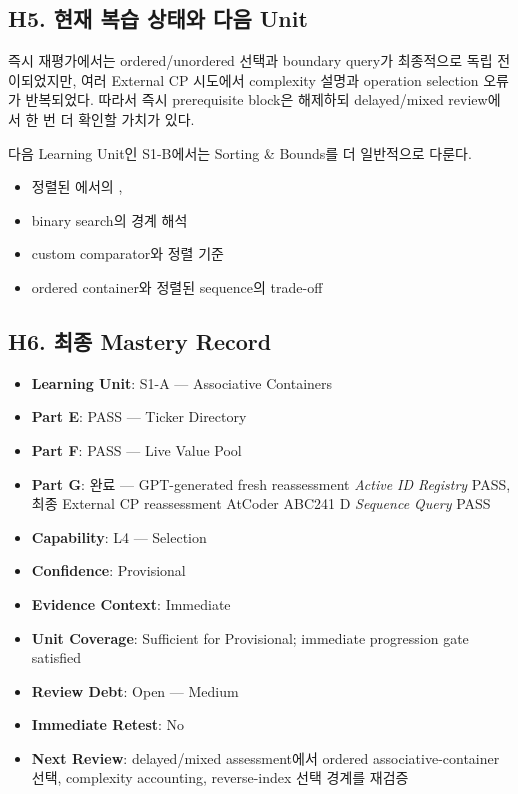 \subsection{H5. 현재 복습 상태와 다음 Unit}
즉시 재평가에서는 ordered/unordered 선택과 boundary query가 최종적으로 독립 전이되었지만, 여러 External CP 시도에서 complexity 설명과 operation selection 오류가 반복되었다. 따라서 즉시 prerequisite block은 해제하되 delayed/mixed review에서 한 번 더 확인할 가치가 있다.

다음 Learning Unit인 S1-B에서는 Sorting \& Bounds를 더 일반적으로 다룬다.
\begin{itemize}
\item 정렬된 에서의 , 
\item binary search의 경계 해석
\item custom comparator와 정렬 기준
\item ordered container와 정렬된 sequence의 trade-off
\end{itemize}


\subsection{H6. 최종 Mastery Record}

\begin{itemize}
\item \textbf{Learning Unit}: S1-A --- Associative Containers
\item \textbf{Part E}: PASS --- Ticker Directory
\item \textbf{Part F}: PASS --- Live Value Pool
\item \textbf{Part G}: 완료 --- GPT-generated fresh reassessment \textit{Active ID Registry} PASS, 최종 External CP reassessment AtCoder ABC241 D \textit{Sequence Query} PASS
\item \textbf{Capability}: L4 --- Selection
\item \textbf{Confidence}: Provisional
\item \textbf{Evidence Context}: Immediate
\item \textbf{Unit Coverage}: Sufficient for Provisional; immediate progression gate satisfied
\item \textbf{Review Debt}: Open --- Medium
\item \textbf{Immediate Retest}: No
\item \textbf{Next Review}: delayed/mixed assessment에서 ordered associative-container 선택, complexity accounting, reverse-index 선택 경계를 재검증
\end{itemize}

